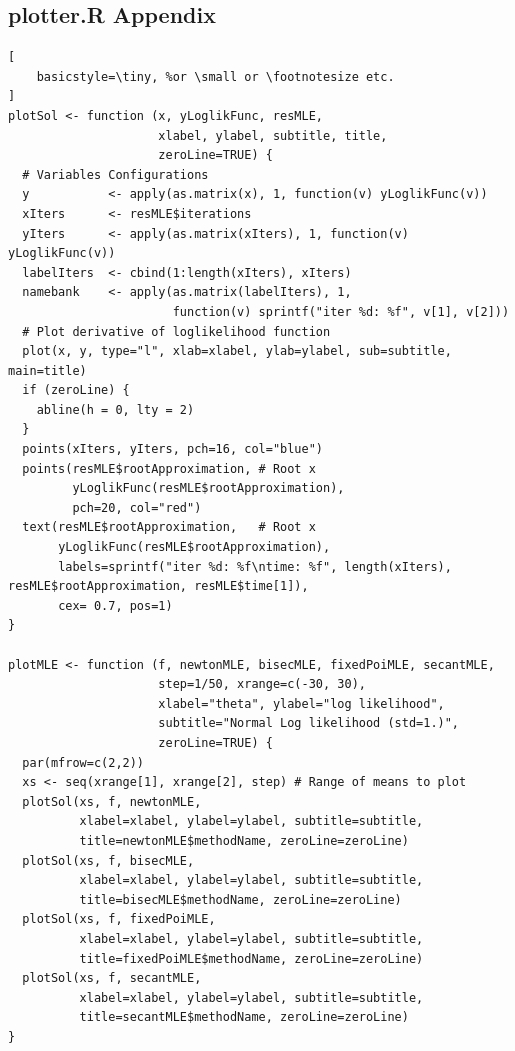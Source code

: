 \begin{appendices}
\section{plotter.R Appendix}
\label{appendix:plotter}
\begin{lstlisting}[
	basicstyle=\tiny, %or \small or \footnotesize etc.
]
plotSol <- function (x, yLoglikFunc, resMLE, 
                     xlabel, ylabel, subtitle, title, 
                     zeroLine=TRUE) {
  # Variables Configurations
  y           <- apply(as.matrix(x), 1, function(v) yLoglikFunc(v))
  xIters      <- resMLE$iterations 
  yIters      <- apply(as.matrix(xIters), 1, function(v) yLoglikFunc(v))
  labelIters  <- cbind(1:length(xIters), xIters)
  namebank    <- apply(as.matrix(labelIters), 1, 
                       function(v) sprintf("iter %d: %f", v[1], v[2]))
  # Plot derivative of loglikelihood function
  plot(x, y, type="l", xlab=xlabel, ylab=ylabel, sub=subtitle, main=title)
  if (zeroLine) {
    abline(h = 0, lty = 2)
  }
  points(xIters, yIters, pch=16, col="blue")
  points(resMLE$rootApproximation, # Root x
         yLoglikFunc(resMLE$rootApproximation), 
         pch=20, col="red")
  text(resMLE$rootApproximation,   # Root x
       yLoglikFunc(resMLE$rootApproximation),
       labels=sprintf("iter %d: %f\ntime: %f", length(xIters), resMLE$rootApproximation, resMLE$time[1]), 
       cex= 0.7, pos=1)
}

plotMLE <- function (f, newtonMLE, bisecMLE, fixedPoiMLE, secantMLE, 
                     step=1/50, xrange=c(-30, 30),
                     xlabel="theta", ylabel="log likelihood", 
                     subtitle="Normal Log likelihood (std=1.)",
                     zeroLine=TRUE) {
  par(mfrow=c(2,2))
  xs <- seq(xrange[1], xrange[2], step) # Range of means to plot
  plotSol(xs, f, newtonMLE, 
          xlabel=xlabel, ylabel=ylabel, subtitle=subtitle, 
          title=newtonMLE$methodName, zeroLine=zeroLine)
  plotSol(xs, f, bisecMLE, 
          xlabel=xlabel, ylabel=ylabel, subtitle=subtitle, 
          title=bisecMLE$methodName, zeroLine=zeroLine)
  plotSol(xs, f, fixedPoiMLE, 
          xlabel=xlabel, ylabel=ylabel, subtitle=subtitle, 
          title=fixedPoiMLE$methodName, zeroLine=zeroLine)
  plotSol(xs, f, secantMLE, 
          xlabel=xlabel, ylabel=ylabel, subtitle=subtitle, 
          title=secantMLE$methodName, zeroLine=zeroLine)
}


\end{lstlisting}
\end{appendices}
